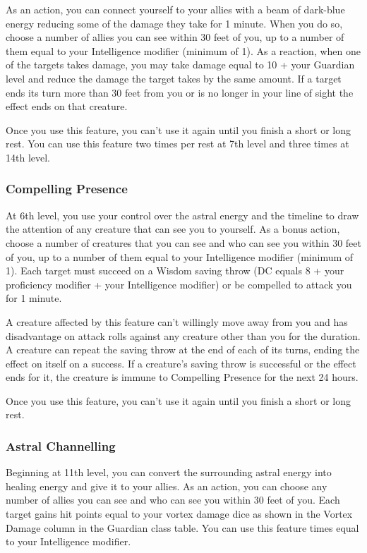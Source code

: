 As an action, you can connect yourself to your allies with a beam of dark-blue energy reducing some of the damage they take for 1 minute. When you do so, choose a number of allies you can see within 30 feet of you, up to a number of them equal to your Intelligence modifier (minimum of 1). As a reaction, when one of the targets takes damage, you may take damage equal to 10 + your Guardian level and reduce the damage the target takes by the same amount. If a target ends its turn more than 30 feet from you or is no longer in your line of sight the effect ends on that creature.

Once you use this feature, you can't use it again until you finish a short or long rest. You can use this feature two times per rest at 7th level and three times at 14th level.

\subsubsection{Compelling Presence}

At 6th level, you use your control over the astral energy and the timeline to draw the attention of any creature that can see you to yourself. As a bonus action, choose a number of creatures that you can see and who can see you within 30 feet of you, up to a number of them equal to your Intelligence modifier (minimum of 1). Each target must succeed on a Wisdom saving throw (DC equals 8 + your proficiency modifier + your Intelligence modifier) or be compelled to attack you for 1 minute.

A creature affected by this feature can't willingly move away from you and has disadvantage on attack rolls against any creature other than you for the duration. A creature can repeat the saving throw at the end of each of its turns, ending the effect on itself on a success. If a creature's saving throw is successful or the effect ends for it, the creature is immune to Compelling Presence for the next 24 hours.

Once you use this feature, you can't use it again until you finish a short or long rest.

\subsubsection{Astral Channelling}

Beginning at 11th level, you can convert the surrounding astral energy into healing energy and give it to your allies. As an action, you can choose any number of allies you can see and who can see you within 30 feet of you. Each target gains hit points equal to your vortex damage dice as shown in the Vortex Damage column in the Guardian class table. You can use this feature times equal to your Intelligence modifier.

